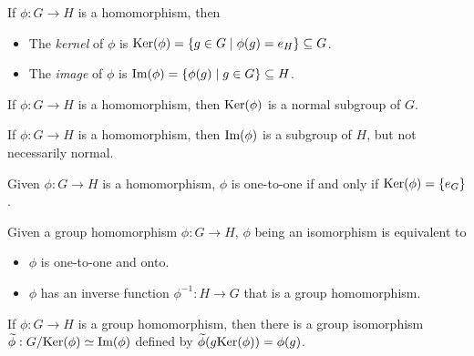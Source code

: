 \begin{definition}
	If $\phi : G \rightarrow H$ is a homomorphism, then
	\begin{itemize}
		\item The \emph{kernel} of $\phi$ is $\text{Ker}(\phi) = \{g \in G \mid \phi(g) =
			e_H\} \subseteq G$.
		\item The \emph{image} of $\phi$ is $\text{Im}(\phi) = \{\phi(g) \mid g \in
			G\} \subseteq H$.
	\end{itemize}
\end{definition}

\begin{theorem}
	If $\phi : G \rightarrow H$ is a homomorphism, then $\text{Ker}(\phi)$ is a normal
	subgroup of $G$.
\end{theorem}

\begin{theorem}
	If $\phi : G \rightarrow H$ is a homomorphism, then $\text{Im}(\phi)$ is a
	subgroup of $H$, but not necessarily normal.
\end{theorem}

\begin{theorem}
	Given $\phi : G \rightarrow H$ is a homomorphism, $\phi$ is one-to-one if and
	only if $\text{Ker}(\phi) = \{e_G\}$.
\end{theorem}

\begin{theorem}
	Given a group homomorphism $\phi : G \rightarrow H$, $\phi$ being an
	isomorphism is equivalent to
	\begin{itemize}
		\item $\phi$ is one-to-one and onto.
		\item $\phi$ has an inverse function $\phi^{-1} : H \rightarrow G$ that is a
			group homomorphism.
	\end{itemize}
\end{theorem}

\begin{theorem}
	If $\phi : G \rightarrow H$ is a group homomorphism, then there is a group
	isomorphism $\widetilde{\phi} : G/\text{Ker}(\phi) \simeq \text{Im}(\phi)$ defined
	by $\widetilde{\phi}(g \text{Ker}(\phi)) = \phi(g)$.
\end{theorem}
